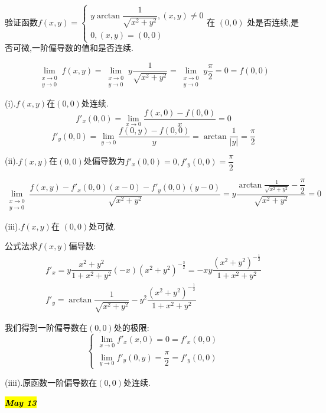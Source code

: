 验证函数$f(x,y)=\left\lbrace
\begin{array}{l}
	y\arctan\dfrac{1}{\sqrt{x^2+y^2}},(x,y)\neq 0\\
	0,(x,y)=(0,0)
\end{array}
\right. $在 $(0,0)$ 处是否连续,是否可微,一阶偏导数的值和是否连续.
\begin{solution}
	$$\lim\limits_{\substack{x\rightarrow 0\\ y\rightarrow 0}}f(x,y)=\lim\limits_{\substack{x\rightarrow 0\\ y\rightarrow 0}}y\frac{1}{\sqrt{x^2+y^2}}=\lim\limits_{\substack{x\rightarrow 0\\ y\rightarrow 0}}y\frac{\pi}{2}=0=f(0,0)$$
	
	(i).$f(x,y)$在$(0,0)$处连续.
	$$f'_{x}(0,0)=\lim\limits_{x\rightarrow 0}\frac{f(x,0)-f(0,0)}{x}=0$$
	$$f'_{y}(0,0)=\lim\limits_{y\rightarrow 0}\frac{f(0,y)-f(0,0)}{y}=\arctan\frac{1}{|y|}=\frac{\pi}{2}$$
	
	(ii).$f(x,y)$在$(0,0)$处偏导数为$f'_{x}(0,0)=0,f'_{y}(0,0)=\dfrac{\pi}{2}$
	
	$$\lim\limits_{\substack{x\rightarrow 0\\ y\rightarrow 0}}\frac{f(x,y)-f'_{x}(0,0)(x-0)-f'_{y}(0,0)(y-0)}{\sqrt{x^2+y^2}}=y\dfrac{\arctan\frac{1}{\sqrt{x^2+y^2}}-\dfrac{\pi}{2}}{\sqrt{x^2+y^2}}=0$$
	
	(iii).$f(x,y)$在 $(0,0)$处可微.
	
	公式法求$f(x,y)$偏导数: 
	$$\begin{array}{l}
		f'_{x}=y\dfrac{x^2+y^2}{1+x^2+y^2}(-x)(x^2+y^2)^{-\frac{3}{2}}=-xy\dfrac{(x^2+y^2)^{-\frac{1}{2}}}{1+x^2+y^2}\\
		f'_{y}=\arctan\dfrac{1}{\sqrt{x^2+y^2}}-y^2\dfrac{(x^2+y^2)^{-\frac{1}{2}}}{1+x^2+y^2}
	\end{array}$$
	
	我们得到一阶偏导数在$(0,0)$处的极限: 
	$$\left\lbrace \begin{array}{l}
		\lim\limits_{x\rightarrow0}f'_{x}(x,0)=0=f'_{x}(0,0)\\
		\lim\limits_{y\rightarrow0}f'_{y}(0,y)=\dfrac{\pi}{2}=f'_{y}(0,0)
	\end{array}\right. $$
	
	(iiii).原函数一阶偏导数在$(0,0)$处连续.
\end{solution}


\hl{\textbf{\textit{May 13}}}

